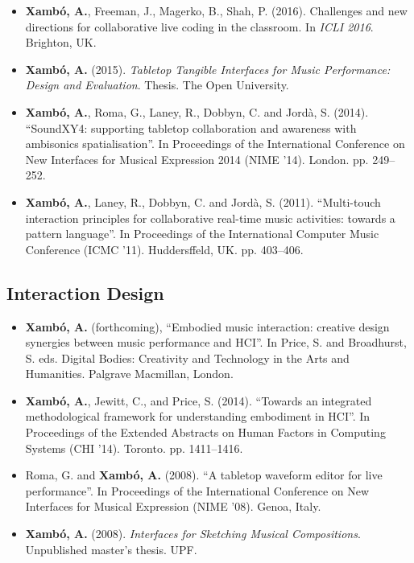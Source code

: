 \documentclass[10pt, a4paper]{article}
\begin{document}
\begin{itemize}
\item \textbf{Xambó, A.}, Freeman, J., Magerko, B., Shah, P. (2016). Challenges and new directions for collaborative live coding in the classroom. In \emph{ICLI 2016}. Brighton, UK.
\item \textbf{Xambó, A.} (2015). \emph{Tabletop Tangible Interfaces for Music Performance: Design and Evaluation}. Thesis. The Open University.
\item \textbf{Xambó, A.}, Roma, G., Laney, R., Dobbyn, C. and Jordà, S. (2014). “SoundXY4: supporting tabletop collaboration and awareness with ambisonics spatialisation”. In Proceedings of the International Conference on New Interfaces for Musical Expression 2014 (NIME ’14). London. pp. 249–252.
\item \textbf{Xambó, A.}, Laney, R., Dobbyn, C. and Jordà, S. (2011). “Multi-touch interaction principles for collaborative real-time music activities: towards a pattern language”. In Proceedings of the International Computer Music Conference (ICMC ’11). Huddersffeld, UK. pp. 403–406.
\end{itemize}

\subsection*{Interaction Design}

\begin{itemize}
\item \textbf{Xambó, A.} (forthcoming), ``Embodied music interaction: creative design synergies between music performance and HCI''. In Price, S. and Broadhurst, S. eds. Digital Bodies: Creativity and Technology in the Arts and Humanities. Palgrave Macmillan, London.
\item \textbf{Xambó, A.}, Jewitt, C., and Price, S. (2014). “Towards an integrated methodological framework for understanding embodiment in HCI”. In Proceedings of the Extended Abstracts on Human Factors in Computing Systems (CHI ’14). Toronto. pp. 1411--1416.
\item Roma, G. and \textbf{Xambó, A.} (2008). “A tabletop waveform editor for live performance”. In Proceedings of the International Conference on New Interfaces for Musical Expression (NIME ’08). Genoa, Italy.
\item \textbf{Xambó, A.} (2008). \emph{Interfaces for Sketching Musical Compositions}. Unpublished master’s thesis. UPF.
\end{itemize}
\end{document}
